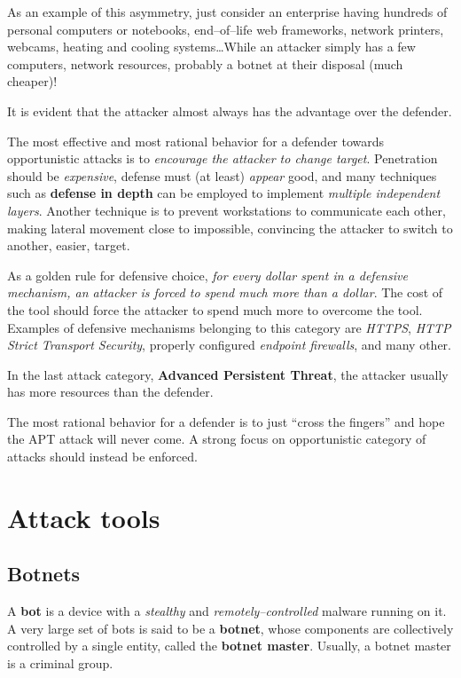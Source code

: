 \documentclass[10pt]{extbook}
\begin{document}
As an example of this asymmetry, just consider an enterprise having hundreds of
personal computers or notebooks, end--of--life web frameworks, network
printers, webcams, heating and cooling systems\dots While an attacker simply
has a few computers, network resources, probably a botnet at their disposal
(much cheaper)!

It is evident that the attacker almost always has the advantage over the
defender.

The most effective and most rational behavior for a defender towards
opportunistic attacks is to \emph{encourage the attacker to change target}.
Penetration should be \emph{expensive}, defense must (at least) \emph{appear}
good, and many techniques such as \textbf{defense in depth} can be employed to
implement \emph{multiple independent layers}. Another technique is to prevent
workstations to communicate each other, making lateral movement close to
impossible, convincing the attacker to switch to another, easier, target.

As a golden rule for defensive choice, \emph{for every dollar spent in a
defensive mechanism, an attacker is forced to spend much more than a dollar}.
The cost of the tool should force the attacker to spend much more to overcome
the tool. Examples of defensive mechanisms belonging to this category are
\emph{HTTPS}, \emph{HTTP Strict Transport Security}, properly configured
\emph{endpoint firewalls}, and many other.

In the last attack category, \textbf{Advanced Persistent Threat}, the attacker
usually has more resources than the defender.

The most rational behavior for a defender is to just ``cross the fingers'' and
hope the APT attack will never come. A strong focus on opportunistic category
of attacks should instead be enforced.

\chapter{Attack tools}

\section{Botnets}

A \textbf{bot} is a device with a \emph{stealthy} and
\emph{remotely--controlled} malware running on it. A very large set of bots is
said to be a \textbf{botnet}, whose components are collectively controlled by a
single entity, called the \textbf{botnet master}. Usually, a botnet master is a
criminal group.
\end{document}
